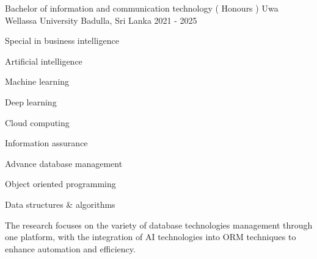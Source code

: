 

\begin{cventries}

  \cventry
    {Bachelor of information and communication technology ( Honours )} %
    {Uwa Wellassa University} %
    {Badulla, Sri Lanka} %
    {2021 - 2025} %
    {
      \begin{cvitems} %
        \item {Special in business intelligence }
        \item {Artificial intelligence}
        \item {Machine learning}
        \item {Deep learning}
        \item {Cloud computing}
        \item {Information assurance }
        \item {Advance database management}
        \item {Object oriented programming}
        \item {Data structures  \&  algorithms}
        \item {The research focuses on the variety of database technologies management through one platform, with the integration of AI technologies into ORM techniques to enhance automation and efficiency.}
      \end{cvitems}
    }

\end{cventries}
